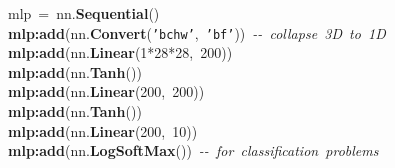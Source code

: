 \noindent
\mbox{}mlp\ =\ nn.\textbf{Sequential}() \\
\mbox{}\textbf{mlp:add}(nn.\textbf{Convert}(\texttt{'bchw'},\ \texttt{'bf'}))\ \textit{-\/-\ collapse\ 3D\ to\ 1D} \\
\mbox{}\textbf{mlp:add}(nn.\textbf{Linear}(1*28*28,\ 200)) \\
\mbox{}\textbf{mlp:add}(nn.\textbf{Tanh}()) \\
\mbox{}\textbf{mlp:add}(nn.\textbf{Linear}(200,\ 200)) \\
\mbox{}\textbf{mlp:add}(nn.\textbf{Tanh}())\  \\
\mbox{}\textbf{mlp:add}(nn.\textbf{Linear}(200,\ 10)) \\
\mbox{}\textbf{mlp:add}(nn.\textbf{LogSoftMax}())\ \textit{-\/-\ for\ classification\ problems}

